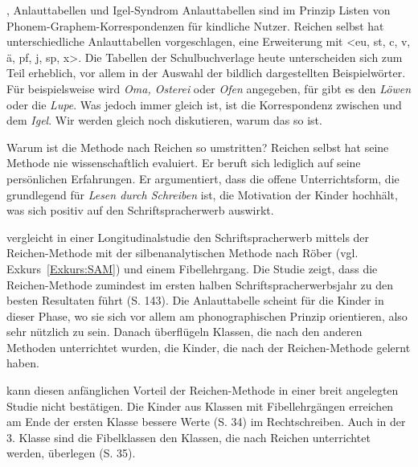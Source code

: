 \begin{Exkurs}{, Anlauttabellen und Igel-Syndrom}
Anlauttabellen sind im Prinzip Listen von Phonem-Graphem-Korres\-pon\-denzen für kindliche Nutzer. Reichen selbst hat unterschiedliche Anlauttabellen vorgeschlagen, \zB eine Erweiterung mit <eu, st, c, v, ä, pf, j, sp, x>. Die Tabellen der Schulbuchverlage heute unterscheiden sich zum Teil erheblich, vor allem in der Auswahl der bildlich dargestellten Beispielwörter. Für  beispielsweise wird \textit{Oma, Osterei} oder \textit{Ofen} angegeben, für  gibt es den \textit{Löwen} oder die \textit{Lupe}. Was jedoch immer gleich ist, ist die Korrespondenz zwischen  und dem \textit{Igel}. Wir werden gleich noch diskutieren, warum das so ist.

Warum ist die Methode nach Reichen so umstritten? Reichen selbst hat seine Methode nie wissenschaftlich evaluiert. Er beruft sich lediglich auf seine persönlichen Erfahrungen. Er argumentiert, dass die offene Unterrichtsform, die grundlegend für \textit{Lesen durch Schreiben} ist, die Motivation der Kinder hochhält, was sich positiv auf den Schriftspracherwerb auswirkt.

\citet{Weinhold2006} vergleicht in einer Longitudinalstudie den Schriftspracherwerb mittels der Reichen-Methode mit der silbenanalytischen Methode nach Röber (vgl. Exkurs~\ref{Exkurs:SAM}) und einem Fibellehrgang. Die Studie zeigt, dass die Reichen-Methode zumindest im ersten halben Schriftspracherwerbsjahr zu den besten Resultaten führt (S. 143). Die Anlauttabelle scheint für die Kinder in dieser Phase, wo sie sich vor allem am phonographischen Prinzip orientieren, also sehr nützlich zu sein. Danach überflügeln Klassen, die nach den anderen Methoden unterrichtet wurden, die Kinder, die nach der Reichen-Methode gelernt haben.

\citet{SchruenderLenzen2006} kann diesen anfänglichen Vorteil der Reichen-Methode in einer breit angelegten Studie nicht bestätigen. Die Kinder aus Klassen mit Fibellehrgängen erreichen am Ende der ersten Klasse bessere Werte (S. 34) im Rechtschreiben. Auch in der 3. Klasse sind die Fibelklassen den Klassen, die nach Reichen unterrichtet werden, überlegen (S. 35).


\end{Exkurs}

